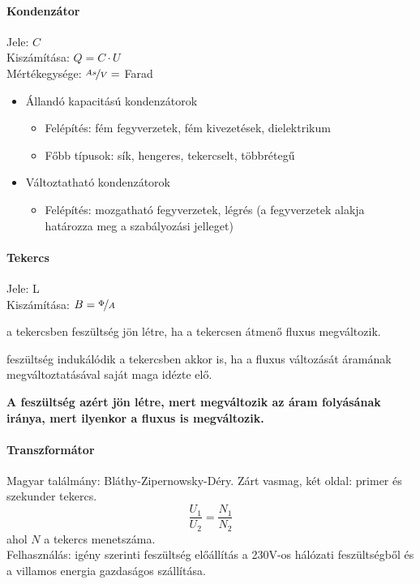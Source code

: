 \paragraph{Kondenzátor}
Jele: $C$\\
Kiszámítása: $Q = C \cdot U$\\
Mértékegysége: $\nicefrac{As}{V} =$ Farad
\begin{itemize}[nosep]
	\item Állandó kapacitású kondenzátorok
	\begin{itemize}[nosep]
		\item Felépítés: fém fegyverzetek, fém kivezetések, dielektrikum
		\item Főbb típusok: sík, hengeres, tekercselt, többrétegű
	\end{itemize}
	\item Változtatható kondenzátorok
	\begin{itemize}[nosep]
		\item Felépítés: mozgatható fegyverzetek, légrés (a fegyverzetek alakja határozza meg a szabályozási jelleget)
	\end{itemize}
\end{itemize}

\paragraph{Tekercs}
Jele: L\\
Kiszámítása: $B = \nicefrac{\Phi}{A}$\\
\begin{description}[nosep]
	\item[Indukció] a tekercsben feszültség jön létre, ha a tekercsen átmenő fluxus megváltozik.
	\item[Önindukció] feszültség indukálódik a tekercsben akkor is, ha a fluxus változását áramának megváltoztatásával saját maga idézte elő.
\end{description}
\textbf{A feszültség azért jön létre, mert megváltozik az áram folyásának iránya, mert ilyenkor a fluxus is megváltozik.}

\paragraph{Transzformátor}
Magyar találmány: Bláthy-Zipernowsky-Déry. Zárt vasmag, két oldal: primer és szekunder tekercs. $$ \frac{U_1}{U_2} = \frac{N_1}{N_2}$$
ahol $N$ a tekercs menetszáma.\\
Felhasználás: igény szerinti feszültség előállítás a 230V-os hálózati feszültségből és a villamos energia gazdaságos szállítása.

